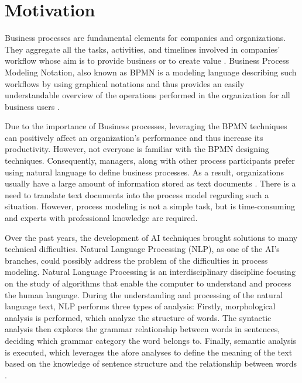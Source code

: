 \chapter{Motivation}

	Business processes are fundamental elements for companies and organizations. They aggregate all the tasks, activities, and timelines involved in companies' workflow whose aim is to provide business or to create value \cite{literature_review_2}. Business Process Modeling Notation, also known as BPMN is a modeling language describing such workflows by using graphical notations and thus provides an easily understandable overview of the operations performed in the organization for all business users \cite{literature_review_1}. 
	
	Due to the importance of Business processes, leveraging the BPMN techniques can positively affect an organization's performance and thus increase its productivity. However, not everyone is familiar with the BPMN designing techniques. Consequently, managers, along with other process participants prefer using natural language to define business processes. As a result, organizations usually have a large amount of information stored as text documents \cite{literature_review_2}. There is a need to translate text documents into the process model regarding such a situation. However, process modeling is not a simple task, but is time-consuming and experts with professional knowledge are required. 
	
	Over the past years, the development of AI techniques brought solutions to many technical difficulties. Natural Language Processing (NLP), as one of the AI's branches, could possibly address the problem of the difficulties in process modeling. Natural Language Processing is an interdisciplinary discipline focusing on the study of algorithms that enable the computer to understand and process the human language\cite{t2m_3}. During the understanding and processing of the natural language text, NLP performs three types of analysis: Firstly, morphological analysis is performed, which analyze the structure of words. The syntactic analysis then explores the grammar relationship between words in sentences, deciding which grammar category the word belongs to. Finally, semantic analysis is executed, which leverages the afore analyses to define the meaning of the text based on the knowledge of sentence structure and the relationship between words \cite{literature_review_2}. 
	
